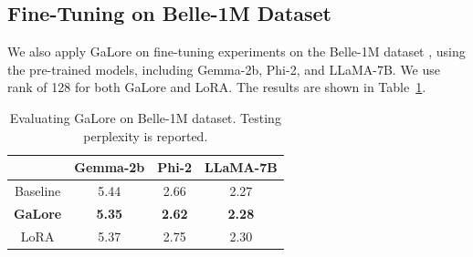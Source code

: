 \subsection{Fine-Tuning on Belle-1M Dataset}
We also apply GaLore on fine-tuning experiments on the Belle-1M dataset \citep{BELLE}, using the pre-trained models, including Gemma-2b, Phi-2, and LLaMA-7B. We use rank of 128 for both GaLore and LoRA. The results are shown in Table~\ref{tab:fine_tuning_belle}.
\begin{table}[h]
    \caption{Evaluating GaLore on Belle-1M dataset. Testing perplexity is reported.}
    \label{tab:fine_tuning_belle}
    \centering
    \begin{tabular}{cccc} %
    \toprule
            & \textbf{Gemma-2b} & \textbf{Phi-2} & \textbf{LLaMA-7B} \\
    \midrule
    Baseline & 5.44 & 2.66 & 2.27 \\
    \midrule
    \textbf{GaLore} & \textbf{5.35} & \textbf{2.62} & \textbf{2.28} \\
    LoRA & 5.37 & 2.75 & 2.30 \\
    \bottomrule
    \end{tabular}
    \vskip -0.1in
\end{table}